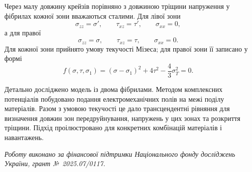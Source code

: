Через малу довжину крейзів порівняно з довжиною тріщини напруження у фібрилах кожної зони вважаються сталими. Для лівої зони
\[
 \sigma_{zz}=\sigma',\qquad \tau_{xz}=\tau',\qquad \sigma_{xx}=0,
\]
а для правої
\[
 \sigma_{zz}=\sigma,\qquad \tau_{xz}=\tau,\qquad \sigma_{xx}=0.
\]
Для кожної зони прийнято умову текучості Мізеса; для правої зони її записано у формі
\begin{equation}
 f(\sigma,\tau,\sigma_1)
 =(\sigma-\sigma_1)^2+4\tau^2-\frac{4}{3}\sigma_T^2=0.
\end{equation}

Детально досліджено модель із двома фібрилами. Методом комплексних потенціалів побудовано подання електромеханічних полів на межі поділу матеріалів. Разом з умовою текучості це дало трансцендентні рівняння для визначення довжин зон передруйнування, напружень у цих зонах та розкриття тріщини. Підхід проілюстровано для конкретних комбінацій матеріалів і навантажень.

\textit{Роботу виконано за фінансової підтримки Національного фонду досліджень України, грант №~2025.07/0117.}
